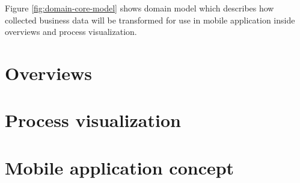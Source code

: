       Figure \ref{fig:domain-core-model} shows domain model which describes how collected business data will be transformed for use in mobile application inside overviews and process visualization. 
    
    \section{Overviews}
    
    \section{Process visualization}
    
    \section{Mobile application concept}
	
    

    
    
